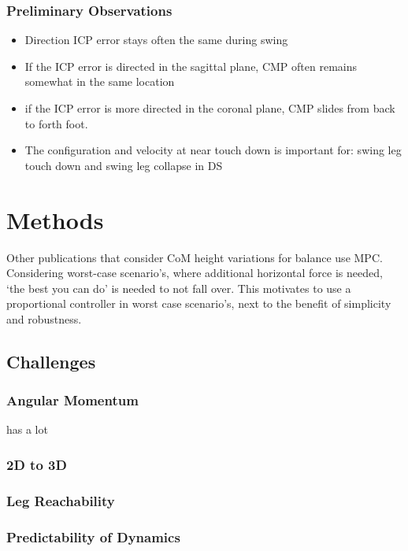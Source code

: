 \subsubsection{Preliminary Observations}
\begin{itemize}
	\item Direction \ac{ICP} error stays often the same during swing
	\item If the \ac{ICP} error is directed in the sagittal plane, CMP often remains somewhat in the same location
	\item if the \ac{ICP} error is more directed  in the coronal plane, CMP slides from back to forth foot. 
	\item The configuration and velocity at near touch down is important for: swing leg touch down and swing leg collapse in \ac{DS}
\end{itemize}

\newpage
\section{Methods}
Other publications that consider \ac{CoM} height variations for balance use \ac{MPC}. Considering worst-case scenario's, where additional horizontal force is needed, `the best you can do' is needed to not fall over. This motivates to use a proportional controller in worst case scenario's, next to the benefit of simplicity and robustness.

\subsection{Challenges}
\subsubsection{Angular Momentum} has a lot
\subsubsection{2D to 3D}
\subsubsection{Leg Reachability}
\subsubsection{Predictability of Dynamics}

